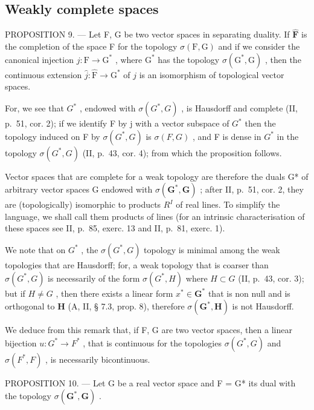 \subsection{Weakly complete spaces}

PROPOSITION 9. --- Let F, G be two vector spaces in separating duality. If \(\hat{\mathbf{F}}\) is the completion of the space F for the topology \(\sigma(\mathrm{F},\mathrm{G})\) and if we consider the canonical injection \(j:\mathrm{F}\to\mathrm{G}^{*}\) , where \(\mathrm{G}^{*}\) has the topology \(\sigma(\mathrm{G}^{*},\mathrm{G})\) , then the continuous extension \(\hat{j}:\hat{\mathrm{F}}\to\mathrm{G}^{*}\) of \(j\) is an isomorphism of topological vector spaces.

For, we see that \(G^{*}\) , endowed with \(\sigma(G^{*}, G)\) , is Hausdorff and complete (II, p.~51, cor. 2); if we identify F by j with a vector subspace of \(G^{*}\) then the topology induced on F by \(\sigma(G^{*}, G)\) is \(\sigma(F, G)\) , and F is dense in \(G^{*}\) in the topology \(\sigma(G^{*}, G)\) (II, p.~43, cor. 4); from which the proposition follows.

Vector spaces that are complete for a weak topology are therefore the duals G* of arbitrary vector spaces G endowed with \(\sigma(\mathbf{G}^{*}, \mathbf{G})\) ; after II, p.~51, cor. 2, they are (topologically) isomorphic to products \(R^{I}\) of real lines. To simplify the language, we shall call them products of lines (for an intrinsic characterisation of these spaces see II, p.~85, exerc. 13 and II, p.~81, exerc. 1).

We note that on \(G^{*}\) , the \(\sigma(G^{*}, G)\) topology is minimal among the weak topologies that are Hausdorff; for, a weak topology that is coarser than \(\sigma(G^{*}, G)\) is necessarily of the form \(\sigma(G^{*}, H)\) where \(H \subset G\) (II, p.~43, cor. 3); but if \(H \neq G\) , then there exists a linear form \(x^{*} \in \mathbf{G}^{*}\) that is non null and is orthogonal to \(\mathbf{H}\) (A, II, § 7.3, prop. 8), therefore \(\sigma(\mathbf{G}^{*}, \mathbf{H})\) is not Hausdorff.

We deduce from this remark that, if F, G are two vector spaces, then a linear bijection \(u:G^{*}\to F^{*}\) , that is continuous for the topologies \(\sigma(G^{*},G)\) and \(\sigma(F^{*},F)\) , is necessarily bicontinuous.

PROPOSITION 10. --- Let G be a real vector space and F = G* its dual with the topology \(\sigma(\mathbf{G}^*, \mathbf{G})\) .

